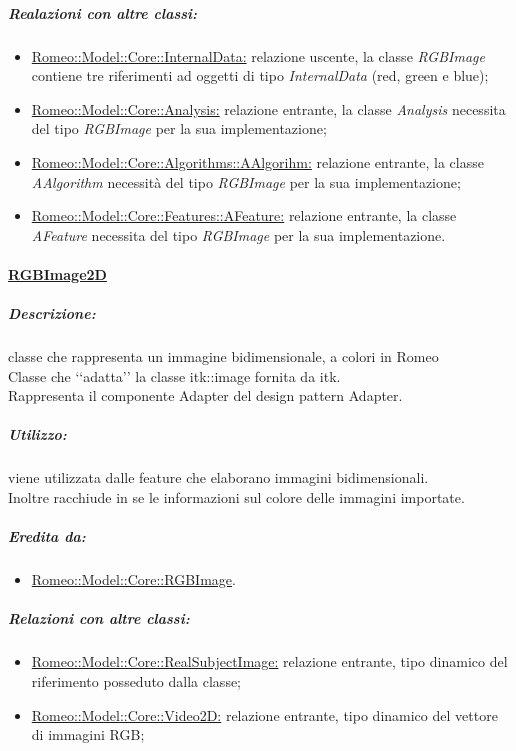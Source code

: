 			\subparagraph{Realazioni con altre classi:}
				\begin{itemize}
					
					\item \hyperref[]{Romeo::Model::Core::InternalData:} relazione uscente, la classe \textsl{RGBImage} contiene tre riferimenti ad oggetti di tipo \textsl{InternalData} (red, green e blue);
					
					\item \hyperref[]{Romeo::Model::Core::Analysis:} relazione entrante, la classe \textsl{Analysis} necessita del tipo \textsl{RGBImage} per la sua implementazione;
					
					\item \hyperref[]{Romeo::Model::Core::Algorithms::AAlgorihm:} relazione entrante, la classe \textsl{AAlgorithm} necessità del tipo \textsl{RGBImage} per la sua implementazione;
					
					\item \hyperref[]{Romeo::Model::Core::Features::AFeature:} relazione entrante, la classe \textsl{AFeature} necessita del tipo \textsl{RGBImage} per la sua implementazione.
					
				\end{itemize}
						
		\paragraph{\underline{RGBImage2D}}
		\label{RGBImage2D}
			
			\subparagraph{Descrizione:} classe che rappresenta un immagine bidimensionale, a colori in Romeo\g{}
			\\Classe che \lq\lq{}adatta\rq\rq{} la classe itk::image fornita da itk.
			\\Rappresenta il componente Adapter del design pattern\g{} Adapter.
			
			\subparagraph{Utilizzo:} viene utilizzata dalle feature\g{} che elaborano immagini bidimensionali.
			\\Inoltre racchiude in se le informazioni sul colore delle immagini importate.
			
			\subparagraph{Eredita da:}
				\begin{itemize}
					\item \hyperref[RGBImage]{Romeo::Model::Core::RGBImage}.
				\end{itemize}
				
			\subparagraph{Relazioni con altre classi:}
				\begin{itemize}
					\item \hyperref[]{Romeo::Model::Core::RealSubjectImage:} relazione entrante, tipo dinamico del riferimento posseduto dalla classe;
					\item \hyperref[]{Romeo::Model::Core::Video2D:} relazione entrante, tipo dinamico del vettore di immagini RGB;
				\end{itemize}
				
